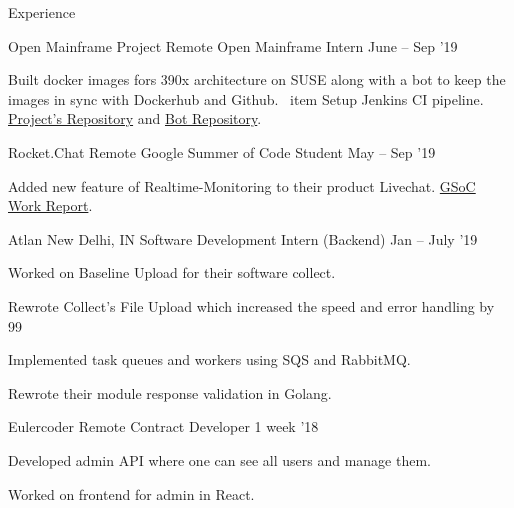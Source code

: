 \documentclass{resume} %
\begin{document}
\begin{rSection}{Experience}
  \begin{rWorkSection}{Open Mainframe Project}
                           {Remote}
                           {Open Mainframe Intern}
                           {June -- Sep '19}
  {
    \item Built docker images fors 390x architecture on SUSE along with a bot to keep the images in sync with Dockerhub and Github.   
    \ item Setup Jenkins CI pipeline. \href{https://github.com/openmainframeproject-internship/DockerHub-Development-Stacks/}{Project's Repository} and \href{https://github.com/knrt10/docker-hub-development-stacks-bot/}{Bot Repository}.  
  }                         
  \end{rWorkSection}

  \begin{rWorkSection}{Rocket.Chat}
                      {Remote}
                      {Google Summer of Code Student}
                      {May -- Sep '19}
  {
    \item Added new feature of Realtime-Monitoring to their product Livechat. \href{http://bit.ly/2kGqWt2/}{GSoC Work Report}.
  }
  \end{rWorkSection}

  \begin{rWorkSection}{Atlan}
                     {New Delhi, IN}
                     {Software Development Intern (Backend)}
                     {Jan -- July '19}
  {
    \item Worked on Baseline Upload for their software collect. 
    \item Rewrote Collect's File Upload which increased the speed and error handling by 99%
    \item Implemented task queues and workers using SQS and RabbitMQ.
    \item Rewrote their module response validation in Golang.
  }
  \end{rWorkSection}

  \begin{rWorkSection}{Eulercoder}
                     {Remote}
                     {Contract Developer}
                     {1 week '18}
  {
    \item Developed admin API where one can see all users and manage them.
    \item Worked on frontend for admin in React.
  }
  \end{rWorkSection}
\end{rSection}
\end{document}
